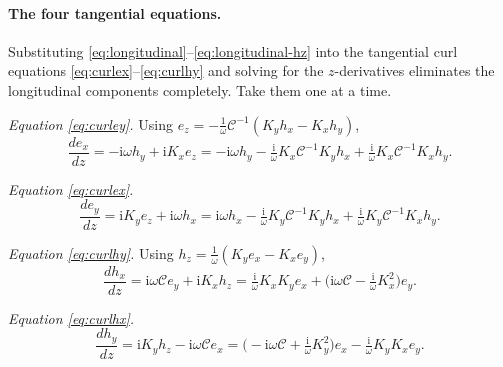 \documentclass[11pt]{article}
\theoremstyle{remark}
\newcommand{\Cmat}{\mathcal{C}}
\newcommand{\ii}{\mathrm{i}}
\begin{document}
\paragraph{The four tangential equations.}
Substituting \eqref{eq:longitudinal}--\eqref{eq:longitudinal-hz} into the
tangential curl equations \eqref{eq:curlex}--\eqref{eq:curlhy} and solving for
the $z$-derivatives eliminates the longitudinal components completely.  Take
them one at a time.

\emph{Equation \eqref{eq:curley}.}  Using
$e_z=-\tfrac{1}{\omega}\Cmat^{-1}(K_y h_x-K_x h_y)$,
\begin{equation}
\frac{d e_x}{dz}=-\ii\omega h_y+\ii K_x e_z
=-\ii\omega h_y-\tfrac{\ii}{\omega}K_x\Cmat^{-1}K_y h_x
+\tfrac{\ii}{\omega}K_x\Cmat^{-1}K_x h_y.
\label{eq:dex}
\end{equation}

\emph{Equation \eqref{eq:curlex}.}
\begin{equation}
\frac{d e_y}{dz}=\ii K_y e_z+\ii\omega h_x
=\ii\omega h_x-\tfrac{\ii}{\omega}K_y\Cmat^{-1}K_y h_x
+\tfrac{\ii}{\omega}K_y\Cmat^{-1}K_x h_y.
\label{eq:dey}
\end{equation}

\emph{Equation \eqref{eq:curlhy}.}  Using
$h_z=\tfrac{1}{\omega}(K_y e_x-K_x e_y)$,
\begin{equation}
\frac{d h_x}{dz}=\ii\omega\Cmat e_y+\ii K_x h_z
=\tfrac{\ii}{\omega}K_xK_y e_x
+\bigl(\ii\omega\Cmat-\tfrac{\ii}{\omega}K_x^2\bigr)e_y.
\label{eq:dhx}
\end{equation}

\emph{Equation \eqref{eq:curlhx}.}
\begin{equation}
\frac{d h_y}{dz}=\ii K_y h_z-\ii\omega\Cmat e_x
=\bigl(-\ii\omega\Cmat+\tfrac{\ii}{\omega}K_y^2\bigr)e_x
-\tfrac{\ii}{\omega}K_yK_x e_y.
\label{eq:dhy}
\end{equation}
\end{document}

